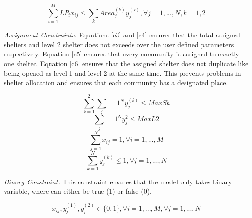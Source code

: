 \documentclass[12pt,a4paper,]{article}
\begin{document}
	\begin{equation} 
		\label{c2}
		\sum_{i=1}^{M}LP_{i}x_{ij} \le \sum_{k} Area_{j}^{(k)} y_{j}^{(k)}, \forall j = 1,..., N , k=1,2
	\end{equation}
	
	\textit{Assignment Constraints.} Equations \ref{c3} and \ref{c4} ensures that the total assigned shelters and level 2 shelter does not exceeds over the user defined parameters respectively.  Equation \ref{c5} ensures that every community is assigned to exactly one shelter. Equation \ref{c6} ensures that the assigned shelter does not duplicate like being opened as level 1 and level 2 at the same time. This prevents problems in shelter allocation and ensures that each community has a designated place.
	
	\begin{equation} 
		\label{c3}
		\sum_{k=1}^{2} \sum_j={1}^{N}y_{j}^{(k)} \le MaxSh
	\end{equation}
	\begin{equation}
		\label{c4} 
		\sum_j={1}^{N}y_{j}^2 \le MaxL2
	\end{equation}
	\begin{equation}
		\label{c5}
		\sum_{j=1}^{N}x_{ij} = 1, \forall i=1,...,M
	\end{equation}
	\begin{equation}
		\label{c6}
		\sum_{k=1}^{N}y_{j}^{(k)} \le 1, \forall j=1,...,N
	\end{equation}
	
	\textit{Binary Constraint.} This constraint ensures that the model only takes binary variable, where can either be true (1) or false (0).
	
	\begin{equation}
		\label{c7}
		x_{ij}, y_{j}^{(1)},y_{j}^{(2)} \in \{0,1\}, \forall i=1,...,M,  \forall j=1,...,N
	\end{equation}
	
\end{document}
